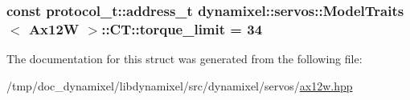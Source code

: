 \subsubsection[{\texorpdfstring{torque\+\_\+limit}{torque_limit}}]{\setlength{\rightskip}{0pt plus 5cm}const {\bf protocol\+\_\+t\+::address\+\_\+t} {\bf dynamixel\+::servos\+::\+Model\+Traits}$<$ {\bf Ax12W} $>$\+::C\+T\+::torque\+\_\+limit = 34\hspace{0.3cm}{\ttfamily [static]}}\hypertarget{structdynamixel_1_1servos_1_1_model_traits_3_01_ax12_w_01_4_1_1_c_t_a4424772bd85ab7bb66c4c8f44a418fa5}{}\label{structdynamixel_1_1servos_1_1_model_traits_3_01_ax12_w_01_4_1_1_c_t_a4424772bd85ab7bb66c4c8f44a418fa5}


The documentation for this struct was generated from the following file\+:\begin{DoxyCompactItemize}
\item 
/tmp/doc\+\_\+dynamixel/libdynamixel/src/dynamixel/servos/\hyperlink{ax12w_8hpp}{ax12w.\+hpp}\end{DoxyCompactItemize}
